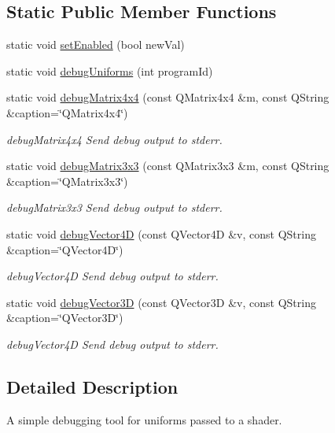 \subsection*{Static Public Member Functions}
\begin{DoxyCompactItemize}
\item 
static void \mbox{\hyperlink{class_shader_debugger_af7f777abe3673cac6a93b301ef539913}{set\+Enabled}} (bool new\+Val)
\item 
static void \mbox{\hyperlink{class_shader_debugger_abe24abd2ac69db02f63c2fb4fc829080}{debug\+Uniforms}} (int program\+Id)
\item 
static void \mbox{\hyperlink{class_shader_debugger_a45249372f2e0c1e5bda7d200bb0dbfa8}{debug\+Matrix4x4}} (const Q\+Matrix4x4 \&m, const Q\+String \&caption=\char`\"{}Q\+Matrix4x4\char`\"{})
\begin{DoxyCompactList}\small\item\em debug\+Matrix4x4 Send debug output to stderr. \end{DoxyCompactList}\item 
static void \mbox{\hyperlink{class_shader_debugger_a6fd11ef28da124fd558f329d55629ee8}{debug\+Matrix3x3}} (const Q\+Matrix3x3 \&m, const Q\+String \&caption=\char`\"{}Q\+Matrix3x3\char`\"{})
\begin{DoxyCompactList}\small\item\em debug\+Matrix3x3 Send debug output to stderr. \end{DoxyCompactList}\item 
static void \mbox{\hyperlink{class_shader_debugger_a457fa04849102556e946cafdf9ea553e}{debug\+Vector4D}} (const Q\+Vector4D \&v, const Q\+String \&caption=\char`\"{}Q\+Vector4D\char`\"{})
\begin{DoxyCompactList}\small\item\em debug\+Vector4D Send debug output to stderr. \end{DoxyCompactList}\item 
static void \mbox{\hyperlink{class_shader_debugger_afd6536a3c6c74c4b6af32ad128ba50d0}{debug\+Vector3D}} (const Q\+Vector3D \&v, const Q\+String \&caption=\char`\"{}Q\+Vector3D\char`\"{})
\begin{DoxyCompactList}\small\item\em debug\+Vector4D Send debug output to stderr. \end{DoxyCompactList}\end{DoxyCompactItemize}


\subsection{Detailed Description}
A simple debugging tool for uniforms passed to a shader. 

